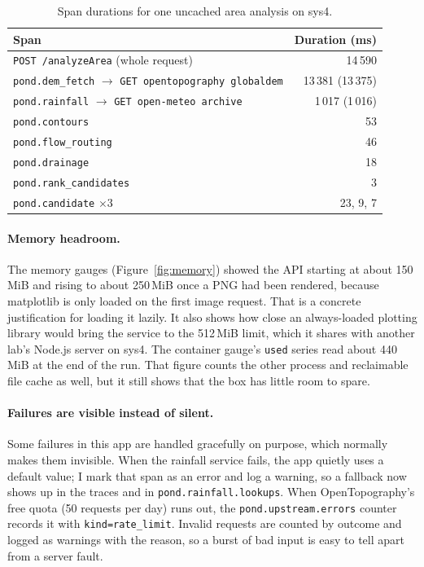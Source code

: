 \documentclass[11pt]{article}
\begin{document}
\begin{table}[htbp]
\centering
\small
\begin{tabular}{@{}lr@{}}
\toprule
Span & Duration (ms) \\
\midrule
\texttt{POST /analyzeArea} (whole request) & 14\,590 \\
\quad \texttt{pond.dem\_fetch} $\rightarrow$ \texttt{GET opentopography globaldem} & 13\,381 \;(13\,375) \\
\quad \texttt{pond.rainfall} $\rightarrow$ \texttt{GET open-meteo archive} & 1\,017 \;(1\,016) \\
\quad \texttt{pond.contours} & 53 \\
\quad \texttt{pond.flow\_routing} & 46 \\
\quad \texttt{pond.drainage} & 18 \\
\quad \texttt{pond.rank\_candidates} & 3 \\
\quad \texttt{pond.candidate} $\times$3 & 23, 9, 7 \\
\bottomrule
\end{tabular}
\caption{Span durations for one uncached area analysis on sys4.}
\label{tab:timings}
\end{table}

\paragraph{Memory headroom.}
The memory gauges (Figure~\ref{fig:memory}) showed the API starting at about
150\,MiB and rising to about 250\,MiB once a PNG had been rendered, because
matplotlib is only loaded on the first image request. That is a concrete
justification for loading it lazily. It also shows how close an always-loaded
plotting library would bring the service to the 512\,MiB limit, which it shares
with another lab's Node.js server on sys4. The container gauge's \texttt{used}
series read about 440\,MiB at the end of the run. That figure counts the other
process and reclaimable file cache as well, but it still shows that the box has
little room to spare.

\paragraph{Failures are visible instead of silent.}
Some failures in this app are handled gracefully on purpose, which normally makes
them invisible. When the rainfall service fails, the app quietly uses a default
value; I mark that span as an error and log a warning, so a fallback now shows up
in the traces and in \texttt{pond.rainfall.lookups}. When OpenTopography's free
quota (50 requests per day) runs out, the \texttt{pond.upstream.errors} counter
records it with \texttt{kind=rate\_limit}. Invalid requests are counted by outcome
and logged as warnings with the reason, so a burst of bad input is easy to tell apart
from a server fault.
\end{document}
